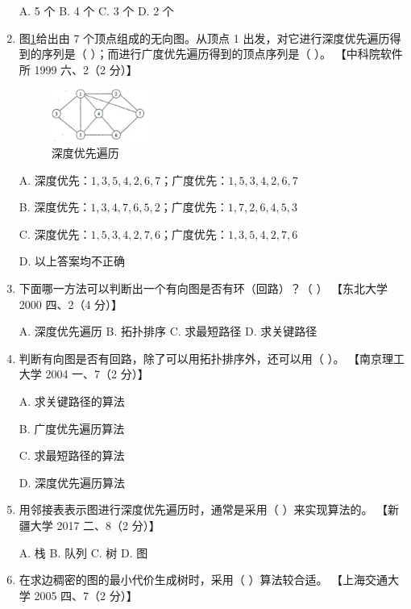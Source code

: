 \documentclass[lang=cn,newtx,10pt,scheme=chinese]{elegantbook}
\begin{document}
\begin{enumerate}
        A. 5 个 \quad B. 4 个 \quad C. 3 个 \quad D. 2 个  
    
        \item 图\ref{fig:7-54}给出由 7 个顶点组成的无向图。从顶点 1 出发，对它进行深度优先遍历得到的序列是（ ）；而进行广度优先遍历得到的顶点序列是（ ）。  
        【中科院软件所 1999 六、2（2 分）】  

        \begin{figure}[h!]
            \centering
            \includegraphics[width=0.3\textwidth]{./figure/exercisePicPDF/chapter7/7-54.pdf}
            \caption{深度优先遍历}
            \label{fig:7-54}
    \end{figure}
        A. 深度优先：$1, 3, 5, 4, 2, 6, 7$；广度优先：$1, 5, 3, 4, 2, 6, 7$  

        B. 深度优先：$1, 3, 4, 7, 6, 5, 2$；广度优先：$1, 7, 2, 6, 4, 5, 3$  

        C. 深度优先：$1, 5, 3, 4, 2, 7, 6$；广度优先：$1, 3, 5, 4, 2, 7, 6$  

        D. 以上答案均不正确  
    
        \item 下面哪一方法可以判断出一个有向图是否有环（回路）？（ ）  
        【东北大学 2000 四、2（4 分）】  

        A. 深度优先遍历 \quad B. 拓扑排序 \quad C. 求最短路径 \quad D. 求关键路径  
    
        \item 判断有向图是否有回路，除了可以用拓扑排序外，还可以用（ ）。  
        【南京理工大学 2004 一、7（2 分）】  

        A. 求关键路径的算法  

        B. 广度优先遍历算法  

        C. 求最短路径的算法  

        D. 深度优先遍历算法  
    
        \item 用邻接表表示图进行深度优先遍历时，通常是采用（ ）来实现算法的。  
        【新疆大学 2017 二、8（2 分）】  

        A. 栈 \quad B. 队列 \quad C. 树 \quad D. 图  
    
        \item 在求边稠密的图的最小代价生成树时，采用（ ）算法较合适。  
        【上海交通大学 2005 四、7（2 分）】  
        

\end{enumerate}
\end{document}
